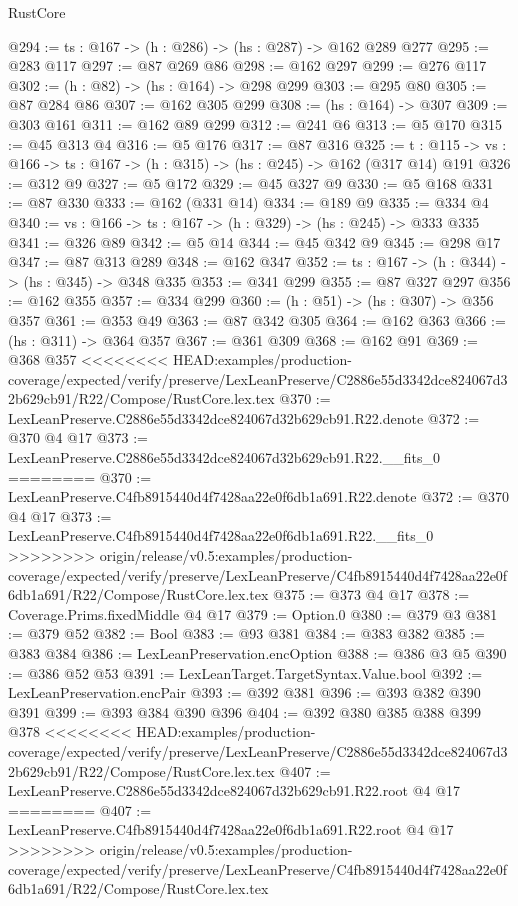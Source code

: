 \begin{lexlean}{RustCore}
\begin{coremodule}
{\begin{coremodule}
@294 := {ts : @167} -> (h : @286) -> (hs : @287) -> @162 @289 @277
@295 := @283 @117
@297 := @87 @269 @86
@298 := @162 @297
@299 := @276 @117
@302 := (h : @82) -> (hs : @164) -> @298 @299
@303 := @295 @80
@305 := @87 @284 @86
@307 := @162 @305 @299
@308 := (hs : @164) -> @307
@309 := @303 @161
@311 := @162 @89 @299
@312 := @241 @6
@313 := @5 @170
@315 := @45 @313 @4
@316 := @5 @176
@317 := @87 @316
@325 := {t : @115} ->
  {vs : @166} -> {ts : @167} -> (h : @315) -> (hs : @245) -> @162 (@317 @14) @191
@326 := @312 @9
@327 := @5 @172
@329 := @45 @327 @9
@330 := @5 @168
@331 := @87 @330
@333 := @162 (@331 @14)
@334 := @189 @9
@335 := @334 @4
@340 := {vs : @166} -> {ts : @167} -> (h : @329) -> (hs : @245) -> @333 @335
@341 := @326 @89
@342 := @5 @14
@344 := @45 @342 @9
@345 := @298 @17
@347 := @87 @313 @289
@348 := @162 @347
@352 := {ts : @167} -> (h : @344) -> (hs : @345) -> @348 @335
@353 := @341 @299
@355 := @87 @327 @297
@356 := @162 @355
@357 := @334 @299
@360 := (h : @51) -> (hs : @307) -> @356 @357
@361 := @353 @49
@363 := @87 @342 @305
@364 := @162 @363
@366 := (hs : @311) -> @364 @357
@367 := @361 @309
@368 := @162 @91
@369 := @368 @357
<<<<<<<< HEAD:examples/production-coverage/expected/verify/preserve/LexLeanPreserve/C2886e55d3342dce824067d32b629cb91/R22/Compose/RustCore.lex.tex
@370 := LexLeanPreserve.C2886e55d3342dce824067d32b629cb91.R22.denote
@372 := @370 @4 @17
@373 := LexLeanPreserve.C2886e55d3342dce824067d32b629cb91.R22.__fits_0
========
@370 := LexLeanPreserve.C4fb8915440d4f7428aa22e0f6db1a691.R22.denote
@372 := @370 @4 @17
@373 := LexLeanPreserve.C4fb8915440d4f7428aa22e0f6db1a691.R22.__fits_0
>>>>>>>> origin/release/v0.5:examples/production-coverage/expected/verify/preserve/LexLeanPreserve/C4fb8915440d4f7428aa22e0f6db1a691/R22/Compose/RustCore.lex.tex
@375 := @373 @4 @17
@378 := Coverage.Prims.fixedMiddle @4 @17
@379 := Option.{0}
@380 := @379 @3
@381 := @379 @52
@382 := Bool
@383 := @93 @381
@384 := @383 @382
@385 := @383 @384
@386 := LexLeanPreservation.encOption
@388 := @386 @3 @5
@390 := @386 @52 @53
@391 := LexLeanTarget.TargetSyntax.Value.bool
@392 := LexLeanPreservation.encPair
@393 := @392 @381
@396 := @393 @382 @390 @391
@399 := @393 @384 @390 @396
@404 := @392 @380 @385 @388 @399 @378
<<<<<<<< HEAD:examples/production-coverage/expected/verify/preserve/LexLeanPreserve/C2886e55d3342dce824067d32b629cb91/R22/Compose/RustCore.lex.tex
@407 := LexLeanPreserve.C2886e55d3342dce824067d32b629cb91.R22.root @4 @17
========
@407 := LexLeanPreserve.C4fb8915440d4f7428aa22e0f6db1a691.R22.root @4 @17
>>>>>>>> origin/release/v0.5:examples/production-coverage/expected/verify/preserve/LexLeanPreserve/C4fb8915440d4f7428aa22e0f6db1a691/R22/Compose/RustCore.lex.tex

\end{coremodule}}
\end{coremodule}
\end{lexlean}

